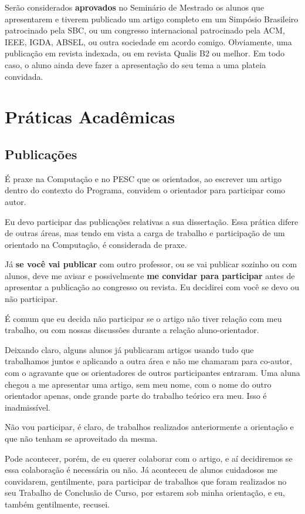 \documentclass{book}
\begin{document}
Serão considerados \textbf{aprovados} no Seminário de Mestrado os alunos que apresentarem e tiverem publicado um artigo completo em um Simpósio Brasileiro patrocinado pela SBC, ou um congresso internacional patrocinado pela ACM, IEEE, IGDA, ABSEL, ou outra sociedade em acordo comigo. Obviamente, uma publicação em revista indexada, ou em revista Qualis B2 ou melhor. Em todo caso, o aluno ainda deve fazer a apresentação do seu tema a uma plateia convidada.

\chapter{Práticas Acadêmicas}

\section{Publicações}

É praxe na Computação e no PESC que os orientados, ao escrever um artigo dentro do contexto do Programa, convidem o orientador para participar como autor. 

Eu devo participar das publicações relativas a sua dissertação. Essa prática difere de outras áreas, mas tendo em vista a carga de trabalho e participação de um orientado na Computação, é considerada de praxe. 

Já \textbf{se você vai publicar} com outro professor, ou se vai publicar sozinho ou com alunos, deve me avisar e possivelmente \textbf{me convidar para participar} antes de apresentar a publicação ao congresso ou revista. Eu decidirei com você se devo ou não participar. 

É comum que eu decida não participar se o artigo não tiver relação com meu trabalho, ou com nossas discussões durante a relação aluno-orientador. 

Deixando claro, alguns alunos já publicaram artigos usando tudo que trabalhamos juntos e aplicando a outra área e não me chamaram para co-autor, com o agravante que os orientadores de outros participantes entraram. Uma aluna chegou a me apresentar uma artigo, sem meu nome, com o nome do outro orientador apenas, onde grande parte do trabalho teórico era meu. Isso é inadmissível. 

Não vou participar, é claro, de trabalhos realizados anteriormente a orientação e que não tenham se aproveitado da mesma.

Pode acontecer, porém, de eu querer colaborar com o artigo, e aí decidiremos se essa colaboração é necessária ou não. Já aconteceu de alunos cuidadosos me convidarem, gentilmente, para participar de trabalhos que foram realizados no seu Trabalho de Conclusão de Curso, por estarem sob minha orientação, e eu, também gentilmente, recusei.
\end{document}
